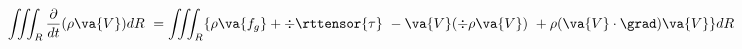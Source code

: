 \begin{equation}
  \iiint_R\frac{\partial}{dt}(\rho\va{V})dR \
  = \iiint_R\{\rho\va{f_g} + \div{\rttensor{\tau}} \
  - \va{V}(\div{\rho\va{V}}) \
  + \rho(\va{V}\cdot\grad)\va{V}\}dR
\end{equation}

